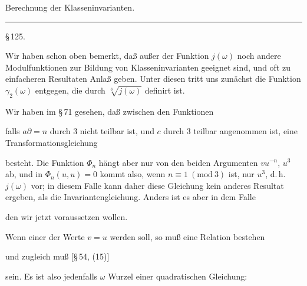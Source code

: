 
\begin{center}

\vspace{1em}
{\Large Berechnung der Klasseninvarianten.}

\vspace{0.5em}
\rule{2cm}{0.4pt}

\vspace{1em}
\S\,125. 
\end{center}

Wir haben schon oben bemerkt, daß außer der Funktion $j(\omega)$ noch
andere Modulfunktionen zur Bildung von Klasseninvarianten geeignet
sind, und oft zu einfacheren Resultaten Anlaß geben. Unter diesen
tritt uns zunächst die Funktion $\gamma_2(\omega)$ entgegen, die durch
$\sqrt[3]{j(\omega)}$ definirt ist. %

Wir haben im \S\,71 gesehen, daß zwischen den Funktionen


falls $a\partial = n$ durch 3 nicht teilbar ist, und $c$ durch 3
teilbar angenommen ist, eine Transformationsgleichung


besteht. Die Funktion $\Phi_n$ hängt aber nur von den beiden
Argumenten $vu^{-n}$, $u^3$ ab, und in $\Phi_n(u, u) = 0$ kommt also,
wenn $n \equiv 1\ (\mathrm{mod}\ 3)$ ist, nur $u^3$, d.\,h. $j(\omega)$
vor; in diesem Falle kann daher diese Gleichung kein anderes Resultat
ergeben, als die Invariantengleichung. Anders ist es aber in dem
Falle


den wir jetzt voraussetzen wollen.

Wenn einer der Werte $v = u$ werden soll, so muß eine Relation
bestehen


und zugleich muß [\S\,54, (15)]


sein. Es ist also jedenfalls $\omega$ Wurzel einer quadratischen
Gleichung:

